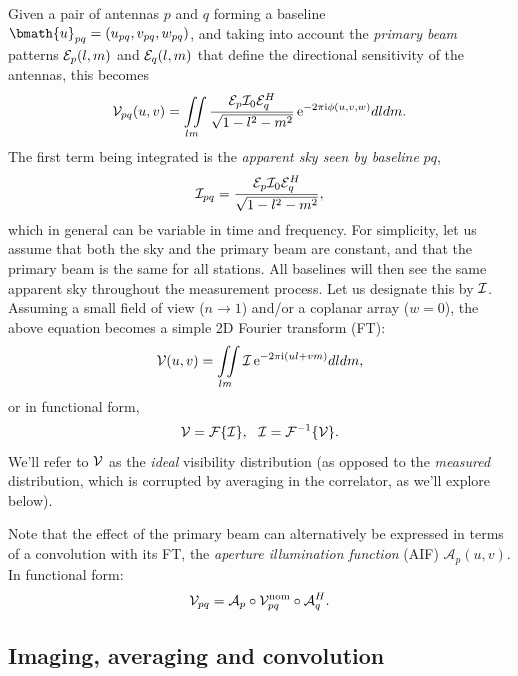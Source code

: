 \documentclass[useAMS,usenatbib]{mn2e}
\newcommand{\ee}{\mathrm{e}}
\newcommand{\ii}{\mathrm{i}}
\begin{document}
Given a pair of antennas $p$ and $q$ forming a baseline $\bmath{u}_{pq}=(u_{pq},v_{pq},w_{pq})$, 
and taking into account the \emph{primary beam} patterns $\mathcal{E}_p(l,m)$ and $\mathcal{E}_q(l,m)$ that define the directional sensitivity of 
the antennas, this becomes 
\begin{equation}
\VV_{pq}(u,v)=\iint\limits_{lm} \frac{\EE_p \II_0 \EE_q^H}{\sqrt{1-l^2 - m^2}}\,\ee^{-2\pi\ii\phi (u,v,w)}dldm. \label{eq:visSky}
\end{equation}
The first term being integrated is the \emph{apparent sky seen by baseline} $pq$,
\begin{equation}
\mathcal{I}_{pq} = \frac{\mathcal{E}_p \mathcal{I}_0 \mathcal{E}_q^H}{\sqrt{1-l^2 - m^2}},
\end{equation} 
which in general can be variable in time and frequency. For simplicity, let us assume that both the sky and the primary beam are constant, and that the primary beam is the same for all stations. All baselines will then see the same apparent sky throughout the measurement process. Let us designate this by $\mathcal{I}$. Assuming a small field of view ($n\to 1$) and/or a coplanar array ($w=0$), the above equation becomes a simple 2D Fourier transform (FT):
\begin{equation}
\VV(u,v)=\iint\limits_{lm} \II\,\ee^{-2\pi\ii(ul+vm)}dldm, \label{eq:visSky:2D}
\end{equation} 
or in functional form,
\begin{equation}
\mathcal{V}=\mathcal{F}\{\mathcal{I}\},~~\mathcal{I}=\mathcal{F}^{-1}\{\mathcal{V}\}.
\end{equation}
We'll refer to $\mathcal{V}$ as the \emph{ideal} visibility distribution (as opposed
to the \emph{measured} distribution, which is corrupted by averaging in the correlator, as we'll explore below).

Note that the effect of the primary beam can alternatively be expressed in terms of a convolution with its FT, the \emph{aperture 
illumination function} (AIF) $\mathcal{A}_p(u,v)$. In functional form:
\begin{equation}
\mathcal{V}_{pq} = \mathcal{A}_p \circ \mathcal{V}^\mathrm{nom}_{pq} \circ \mathcal{A}_q^H.\label{eq:visSky:conv}
\end{equation} 

\subsection{Imaging, averaging and convolution}
\end{document}
